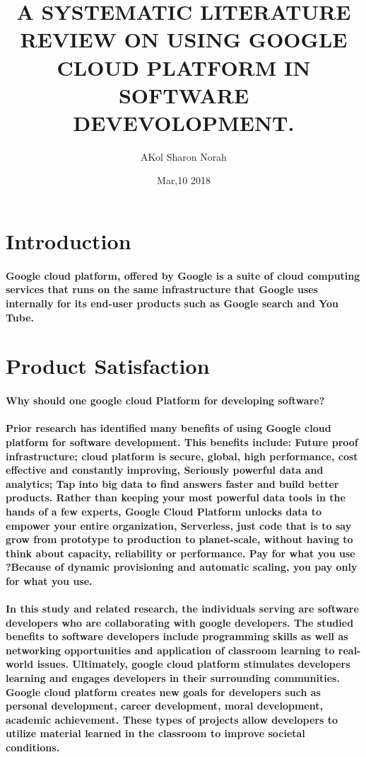 \documentclass{article}
\title{A SYSTEMATIC LITERATURE REVIEW ON USING GOOGLE CLOUD PLATFORM IN SOFTWARE DEVEVOLOPMENT. 
}
\author{AKol Sharon Norah}
\date{Mar,10 2018}
\begin{document}
\maketitle

\newpage

\section{Introduction}
\paragraph{Google cloud platform, offered by Google is a suite of cloud computing services that runs on the same infrastructure that Google uses internally for its end-user products such as Google search and You Tube.\cite{myrefone}}





\section{Product Satisfaction}
\paragraph{Why should one google cloud Platform for developing software?}
\paragraph{
Prior research has identified many benefits of using Google cloud platform for software development. This benefits include: Future proof infrastructure; cloud platform is secure, global, high performance, cost effective and constantly improving, Seriously powerful data and analytics; Tap into big data to find answers faster and build better products.  Rather than keeping your most powerful data tools in the hands of a few experts, Google Cloud Platform unlocks data to empower your entire organization, Serverless, just code that is to say grow from prototype to production to planet-scale, without having to think about capacity, reliability or performance. Pay for what you use ?Because of dynamic provisioning and automatic scaling, you pay only for what you use.\cite{myreftwo} }
\paragraph{
In this study and related research, the individuals serving are software developers who are collaborating with google developers. The studied benefits to software developers include programming skills as well as networking opportunities and application of classroom learning to real-world issues. Ultimately, google cloud platform stimulates developers learning and engages developers in their surrounding communities. Google cloud platform creates new goals for developers such as personal development, career development, moral development, academic achievement. These types of projects allow developers to utilize material learned in the classroom to improve societal conditions\cite{myrefthree}.}
\end{document}

